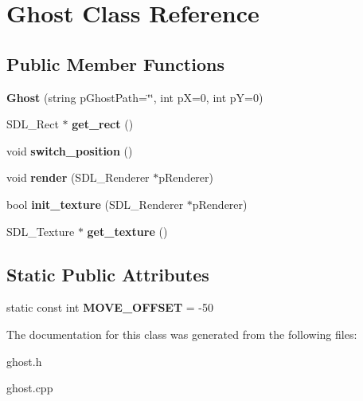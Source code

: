 \hypertarget{classGhost}{}\section{Ghost Class Reference}
\label{classGhost}
\subsection*{Public Member Functions}
\begin{DoxyCompactItemize}
\item 
\mbox{\label{classGhost_a93e4354c66d92ba5977885055d8c2705}} 
{\bfseries Ghost} (string p\+Ghost\+Path=\char`\"{}\char`\"{}, int pX=0, int pY=0)
\item 
\mbox{\label{classGhost_ae811bc3e38a80bf701a268b9da46e6e8}} 
S\+D\+L\+\_\+\+Rect $\ast$ {\bfseries get\+\_\+rect} ()
\item 
\mbox{\label{classGhost_aa1520e54726a56ea8b1fc03785089ad3}} 
void {\bfseries switch\+\_\+position} ()
\item 
\mbox{\label{classGhost_ad149e78254ccf20a693532d2e411d55c}} 
void {\bfseries render} (S\+D\+L\+\_\+\+Renderer $\ast$p\+Renderer)
\item 
\mbox{\label{classGhost_a388e02cbb9c22287ac0df71187917cb3}} 
bool {\bfseries init\+\_\+texture} (S\+D\+L\+\_\+\+Renderer $\ast$p\+Renderer)
\item 
\mbox{\label{classGhost_a03f0f5267a519df936c04ef936f6f844}} 
S\+D\+L\+\_\+\+Texture $\ast$ {\bfseries get\+\_\+texture} ()
\end{DoxyCompactItemize}
\subsection*{Static Public Attributes}
\begin{DoxyCompactItemize}
\item 
\mbox{\label{classGhost_ad381be2e824cd980c4bf02533e1a597f}} 
static const int {\bfseries M\+O\+V\+E\+\_\+\+O\+F\+F\+S\+ET} = -\/50
\end{DoxyCompactItemize}


The documentation for this class was generated from the following files\+:\begin{DoxyCompactItemize}
\item 
ghost.\+h\item 
ghost.\+cpp\end{DoxyCompactItemize}
